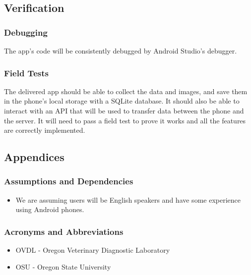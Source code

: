 \documentclass[onecolumn, draftclsnofoot,10pt, compsoc]{IEEEtran}
\begin{document}
\subsection{Verification}
\subsubsection{Debugging}
The app's code will be consistently debugged by Android Studio's debugger.

\subsubsection{Field Tests}
The delivered app should be able to collect the data and images, and save them in the phone's local storage with a SQLite database. 
It should also be able to interact with an API that will be used to transfer data between the phone and the server. 
It will need to pass a field test to prove it works and all the features are correctly implemented. 


\subsection{Appendices}
\subsubsection{Assumptions and Dependencies}
\begin{itemize}
\item We are assuming users will be English speakers and have some experience using Android phones. 
\end{itemize}

\subsubsection{Acronyms and Abbreviations}
\begin{itemize}
\item OVDL - Oregon Veterinary Diagnostic Laboratory
\item OSU - Oregon State University 
\end{itemize}

\clearpage
\end{document}
